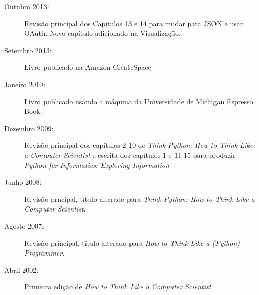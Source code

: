 \begin{latexonly}
{\begin{description}
\item[Outubro 2013:] Revisão principal dos Capítulos 13 e 14
para mudar para JSON e usar OAuth.
Novo capítulo adicionado na Visualização.

\item[Setembro 2013:] Livro publicado na Amazon CreateSpace

\item[Janeiro 2010:] Livro publicado usando a máquina da Universidade de 
Michigan Espresso Book.

\item[Dezembro 2009:] Revisão principal dos capítulos 2-10 de
\emph{Think Python: How to Think Like
a Computer Scientist}
e escrita dos capítulos 1 e 11-15 para
produzir 
\emph{Python for Informatics: Exploring Information}

\item[Junho 2008:] Revisão prncipal, título alterado para
\emph{Think Python: How to Think Like
a Computer Scientist}.

\item[Agosto 2007:] Revisão principal, título alterado para
\emph{How to Think Like a (Python) Programmer}.

\item[Abril 2002:] Primeira edição de \emph{How to Think Like
a Computer Scientist}.

\end{description}

\vspace{0.2in}

}
\end{latexonly}
